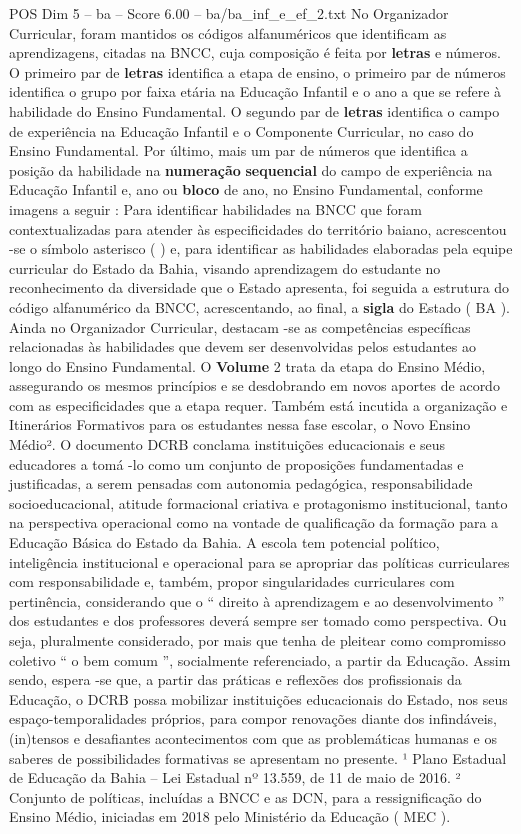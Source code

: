 \begin{textsample}{POS Dim 5 – ba – Score 6.00 – ba/ba\_inf\_e\_ef\_2.txt}
No Organizador Curricular, foram mantidos os códigos alfanuméricos que identificam as aprendizagens, citadas na BNCC, cuja composição é feita por \textbf{letras} e números.
O primeiro par de \textbf{letras} identifica a etapa de ensino, o primeiro par de números identifica o grupo por faixa etária na Educação Infantil e o ano a que se refere à habilidade do Ensino Fundamental.
O segundo par de \textbf{letras} identifica o campo de experiência na Educação Infantil e o Componente Curricular, no caso do Ensino Fundamental.
Por último, mais um par de números que identifica a posição da habilidade na \textbf{numeração} \textbf{sequencial} do campo de experiência na Educação Infantil e, ano ou \textbf{bloco} de ano, no Ensino Fundamental, conforme imagens a seguir : Para identificar habilidades na BNCC que foram contextualizadas para atender às especificidades do território baiano, acrescentou -se o símbolo asterisco ( ) e, para identificar as habilidades elaboradas pela equipe curricular do Estado da Bahia, visando aprendizagem do estudante no reconhecimento da diversidade que o Estado apresenta, foi seguida a estrutura do código alfanumérico da BNCC, acrescentando, ao final, a \textbf{sigla} do Estado ( BA ).
Ainda no Organizador Curricular, destacam -se as competências específicas relacionadas às habilidades que devem ser desenvolvidas pelos estudantes ao longo do Ensino Fundamental.
O \textbf{Volume} 2 trata da etapa do Ensino Médio, assegurando os mesmos princípios e se desdobrando em novos aportes de acordo com as especificidades que a etapa requer.
Também está incutida a organização e Itinerários Formativos para os estudantes nessa fase escolar, o Novo Ensino Médio².
O documento DCRB conclama instituições educacionais e seus educadores a tomá -lo como um conjunto de proposições fundamentadas e justificadas, a serem pensadas com autonomia pedagógica, responsabilidade socioeducacional, atitude formacional criativa e protagonismo institucional, tanto na perspectiva operacional como na vontade de qualificação da formação para a Educação Básica do Estado da Bahia.
A escola tem potencial político, inteligência institucional e operacional para se apropriar das políticas curriculares com responsabilidade e, também, propor singularidades curriculares com pertinência, considerando que o “ direito à aprendizagem e ao desenvolvimento ” dos estudantes e dos professores deverá sempre ser tomado como perspectiva.
Ou seja, pluralmente considerado, por mais que tenha de pleitear como compromisso coletivo “ o bem comum ”, socialmente referenciado, a partir da Educação.
Assim sendo, espera -se que, a partir das práticas e reflexões dos profissionais da Educação, o DCRB possa mobilizar instituições educacionais do Estado, nos seus espaço-temporalidades próprios, para compor renovações diante dos infindáveis, (in)tensos e desafiantes acontecimentos com que as problemáticas humanas e os saberes de possibilidades formativas se apresentam no presente. ¹ Plano Estadual de Educação da Bahia – Lei Estadual nº 13.559, de 11 de maio de 2016. ² Conjunto de políticas, incluídas a BNCC e as DCN, para a ressignificação do Ensino Médio, iniciadas em 2018 pelo Ministério da Educação ( MEC ).

\end{textsample}
